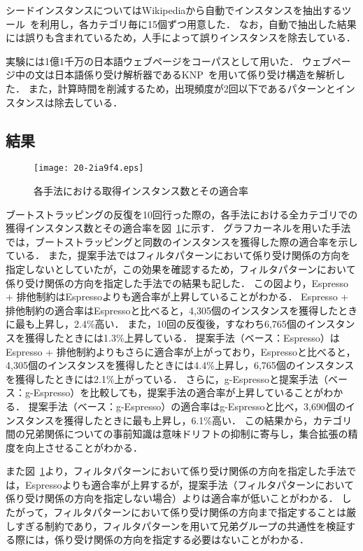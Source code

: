 \documentclass[japanese]{jnlp_1.4}
\begin{document}
シードインスタンスについてはWikipediaから自動でインスタンスを抽出するツール~\cite{SUMIDA08.618}を利用し，各カテゴリ毎に15個ずつ用意した．
なお，自動で抽出した結果には誤りも含まれているため，人手によって誤りインスタンスを除去している．

実験には1億1千万の日本語ウェブページをコーパスとして用いた．
ウェブページ中の文は日本語係り受け解析器であるKNP~\cite{And94knparser}を用いて係り受け構造を解析した．
また，計算時間を削減するため，出現頻度が2回以下であるパターンとインスタンスは除去している．


\subsection{結果}
\label{discussion}

\begin{figure}[b]
\begin{center}
\texttt{[image: 20-2ia9f4.eps]}
\end{center}
 \caption{各手法における取得インスタンス数とその適合率}
 \label{fig:figure3}
\end{figure}

ブートストラッピングの反復を10回行った際の，各手法における全カテゴリでの獲得インスタンス数とその適合率を図~\ref{fig:figure3}に示す．
グラフカーネルを用いた手法では，ブートストラッピングと同数のインスタンスを獲得した際の適合率を示している．
また，提案手法ではフィルタパターンにおいて係り受け関係の方向を指定しないとしていたが，この効果を確認するため，フィルタパターンにおいて係り受け関係の方向を指定した手法での結果も記した．
この図より，Espresso + 排他制約はEspressoよりも適合率が上昇していることがわかる．
Espresso + 排他制約の適合率はEspressoと比べると，4,305個のインスタンスを獲得したときに最も上昇し，2.4\%高い．
また，10回の反復後，すなわち6,765個のインスタンスを獲得したときには1.3\%上昇している．
提案手法（ベース：Espresso）はEspresso + 排他制約よりもさらに適合率が上がっており，Espressoと比べると，4,305個のインスタンスを獲得したときには4.4\%上昇し，6,765個のインスタンスを獲得したときには2.1\%上がっている．
さらに，g-Espressoと提案手法（ベース：g-Espresso）を比較しても，提案手法の適合率が上昇していることがわかる．
提案手法（ベース：g-Espresso）の適合率はg-Espressoと比べ，3,690個のインスタンスを獲得したときに最も上昇し，6.1\%高い．
この結果から，カテゴリ間の兄弟関係についての事前知識は意味ドリフトの抑制に寄与し，集合拡張の精度を向上させることがわかる．


また図~\ref{fig:figure3}より，フィルタパターンにおいて係り受け関係の方向を指定した手法では，Espressoよりも適合率が上昇するが，提案手法（フィルタパターンにおいて係り受け関係の方向を指定しない場合）よりは適合率が低いことがわかる．
したがって，フィルタパターンにおいて係り受け関係の方向まで指定することは厳しすぎる制約であり，フィルタパターンを用いて兄弟グループの共通性を検証する際には，係り受け関係の方向を指定する必要はないことがわかる．
\end{document}
